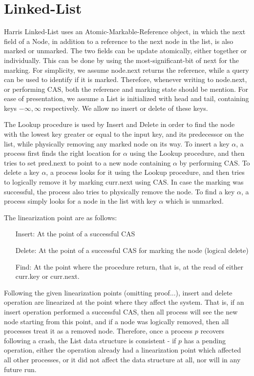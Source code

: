 \section{Linked-List}

Harris Linked-List uses an Atomic-Markable-Reference object, in which the next field of a Node, in addition to a reference to the next node in the list, is also marked or unmarked. The two fields can be update atomically, either together or individually. This can be done by using the most-significant-bit of next for the marking. For simplicity, we assume node.next returns the reference, while a query can be used to identify if it is marked. Therefore, whenever writing to node.next, or performing CAS, both the reference and marking state should be mention.
For ease of presentation, we assume a List is initialized with head and tail, containing keys $-\infty, \infty$ respectively. We allow no insert or delete of these keys.

The Lookup procedure is used by Insert and Delete in order to find the node with the lowest key greater or equal to the input key, and its predecessor on the list, while physically removing any marked node on its way. To insert a key $\alpha$, a process first finds the right location for $\alpha$ using the Lookup procedure, and then tries to set pred.next to point to a new node containing $\alpha$ by performing CAS. To delete a key $\alpha$, a process looks for it using the Lookup procedure, and then tries to logically remove it by marking curr.next using CAS. In case the marking was successful, the process also tries to physically remove the node. To find a key $\alpha$, a process simply looks for a node in the list with key $\alpha$ which is unmarked.

The linearization point are as follows:
\begin{itemize}
	\item [Insert:] At the point of a successful CAS
	\item [Delete:] At the point of a successful CAS for marking the node (logical delete)
	\item [Find:] At the point where the procedure return, that is, at the read of either curr.key or curr.next.
\end{itemize}

Following the given linearization points (omitting proof...), insert and delete operation are linearized at the point where they affect the system. That is, if an insert operation performed a successful CAS, then all process will see the new node starting from this point, and if a node was logically removed, then all processes treat it as a removed node. Therefore, once a process $p$ recovers following a crash, the List data structure is consistent - if $p$ has a pending operation, either the operation already had a linearization point which affected all other processes, or it did not affect the data structure at all, nor will in any future run.

